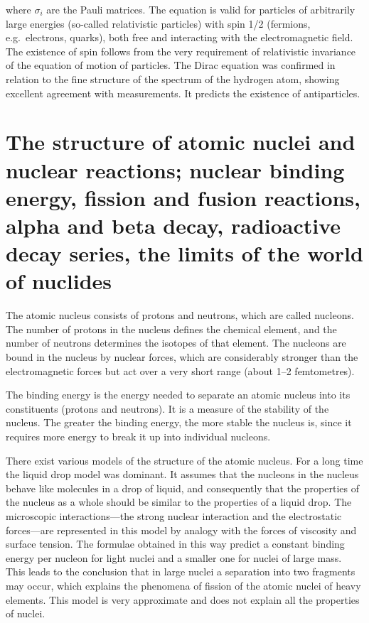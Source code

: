 where $\sigma_i$ are the Pauli matrices. The equation is valid for particles of arbitrarily large energies (so-called relativistic particles) with spin 1/2 (fermions, e.g.\ electrons, quarks), both free and interacting with the electromagnetic field. The existence of spin follows from the very requirement of relativistic invariance of the equation of motion of particles. The Dirac equation was confirmed in relation to the fine structure of the spectrum of the hydrogen atom, showing excellent agreement with measurements. It predicts the existence of antiparticles.

\section{The structure of atomic nuclei and nuclear reactions; nuclear binding energy, fission and fusion reactions, alpha and beta decay, radioactive decay series, the limits of the world of nuclides}

The atomic nucleus consists of protons and neutrons, which are called nucleons. The number of protons in the nucleus defines the chemical element, and the number of neutrons determines the isotopes of that element. The nucleons are bound in the nucleus by nuclear forces, which are considerably stronger than the electromagnetic forces but act over a very short range (about 1--2 femtometres).

The binding energy is the energy needed to separate an atomic nucleus into its constituents (protons and neutrons). It is a measure of the stability of the nucleus. The greater the binding energy, the more stable the nucleus is, since it requires more energy to break it up into individual nucleons.

There exist various models of the structure of the atomic nucleus. For a long time the liquid drop model was dominant. It assumes that the nucleons in the nucleus behave like molecules in a drop of liquid, and consequently that the properties of the nucleus as a whole should be similar to the properties of a liquid drop. The microscopic interactions---the strong nuclear interaction and the electrostatic forces---are represented in this model by analogy with the forces of viscosity and surface tension. The formulae obtained in this way predict a constant binding energy per nucleon for light nuclei and a smaller one for nuclei of large mass. This leads to the conclusion that in large nuclei a separation into two fragments may occur, which explains the phenomena of fission of the atomic nuclei of heavy elements. This model is very approximate and does not explain all the properties of nuclei.

